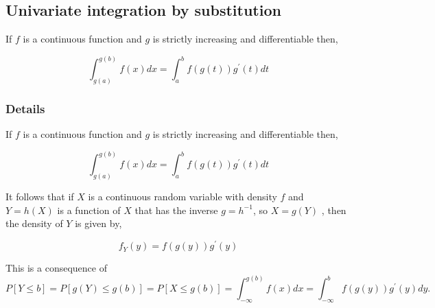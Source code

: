 \documentclass[12pt,a4paper]{article}
\theoremstyle{regla}
\theoremstyle{remark}
\theoremstyle{definition}
\theoremstyle{nonumberbreak}
\begin{document}
\subsection{Univariate integration by substitution}
\begin{fbox}
\begin{minipage}{0.97\textwidth}
If $f$ is a continuous function and $g$ is strictly increasing and differentiable then,


$$ \int_{g(a)}^{g(b)} f(x)dx =  \int_a^b f(g(t))g^\prime (t)dt$$


\end{minipage}
\end{fbox}
\subsubsection{Details}
If $f$ is a continuous function and $g$ is strictly increasing and differentiable then,


$$ \int_{g(a)}^{g(b)} f(x)dx =  \int_a^b f(g(t))g^\prime (t)dt$$


It follows that if $X$ is a continuous random variable with density $f$ and $ Y = h(X)$ is a function of $X$ that has the inverse $g=h^{-1}$, so  $ X = g(Y)$ , then the density of $Y$ is given by,

$$f_Y(y)   = f (g(y)) g^\prime (y)$$

This is a consequence of
$$ P [Y \leq b] = P [g(Y) \leq g(b)] = P [X \leq g(b)] = \int_{- \infty} ^{g(b)}f(x)dx = \int_{- \infty} ^b f (g(y))g^\prime (y)dy.$$

\end{document}
